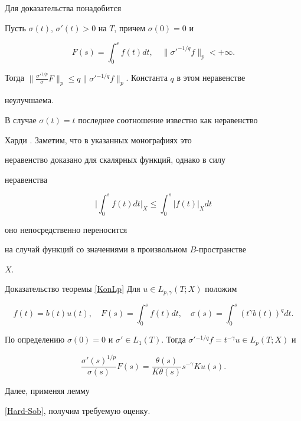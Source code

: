 Для доказательства понадобится





\begin{lems}


\label{Hard-Sob}


Пусть $\sigma(t)$, $\sigma'(t) > 0$ на $T$, причем $\sigma(0)=0$ и


$$


F(s)=\int_0^s f(t) d t, \quad \|{\sigma'}^{-1/q} f\|_p


< +\infty.


$$


Тогда $\big\|\frac{\sigma'{}^{1/p}}{\sigma} F\big\|_p \le q


\|\sigma'{}^{-1/q} f\|_p$. Константа $q$ в этом неравенстве


неулучшаема.


\end{lems}





В случае $\sigma(t)=t$ последнее соотношение известно как неравенство


Харди \cite{Hardi}. Заметим, что в указанных монографиях это


неравенство доказано для скалярных функций, однако в силу


неравенства


$$


\bigg|\int_0^s f(t) d t \bigg|_X \le


\int_0^s |f(t)|_X d t


$$


оно непосредственно переносится


на случай функций со значениями в произвольном $B$-прост\-ран\-ст\-ве


$X$.





\begin{pf*}{Доказательство теоремы \ref{KonLp}} Для $u \in


L_{p,\gamma}(T;X)$ положим


$$


f(t)=b(t)u(t), \quad


F(s)=\int_0^s f(t) d t, \quad \sigma(s)=\int_0^s


(t^\gamma b(t))^q d t.


$$


По определению $\sigma(0)=0$ и $\sigma'


\in L_1(T)$. Тогда $\sigma'{}^{-1/q} f=t^{-\gamma} u \in L_p(T;X)$ и


$$


\frac{\sigma'(s)^{1/p}}{\sigma(s)}F(s)=\frac{\theta(s)}{K


\theta(s)}s^{-\gamma} K u (s).


$$


Далее, применяя лемму


\ref{Hard-Sob}, получим требуемую оценку.


\end{pf*}





